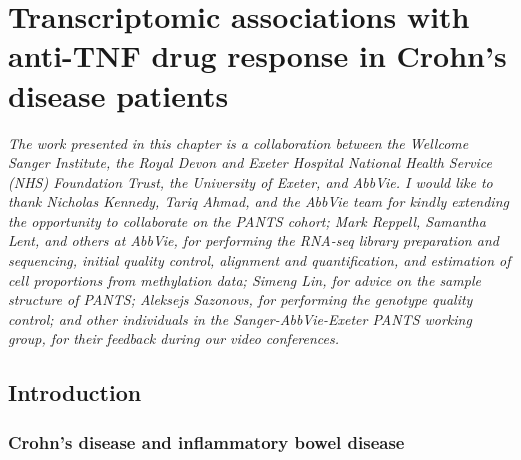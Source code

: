 %
%

\chapter{Transcriptomic associations with anti-TNF drug response in Crohn's disease patients}
\label{ch:multiPANTS}

\textit{
    The work presented in this chapter is a collaboration between 
    the Wellcome Sanger Institute,
    the Royal Devon and Exeter Hospital National Health Service (NHS) Foundation Trust,
    the University of Exeter,
    and AbbVie.
    I would like to thank 
    Nicholas Kennedy, Tariq Ahmad, and the AbbVie team for kindly extending the opportunity to collaborate on the PANTS cohort;
    Mark Reppell, Samantha Lent, and others at AbbVie, for performing the RNA-seq library preparation and sequencing, initial quality control, alignment and quantification, and estimation of cell proportions from methylation data;
    Simeng Lin, for advice on the sample structure of PANTS;
    Aleksejs Sazonovs, for performing the genotype quality control;
    and other individuals in the Sanger-AbbVie-Exeter PANTS working group, for their feedback during our video conferences.
}

\section{Introduction}

\subsection{Crohn's disease and inflammatory bowel disease}

